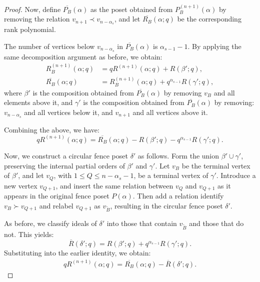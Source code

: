 \documentclass{article}
\theoremstyle{remark}
\begin{document}
\begin{proof}
Now, define \( \overline{P_B}(\alpha) \) as the poset obtained from \( P_B^{(n+1)}(\alpha) \) by removing the relation \( v_{n+1} \prec v_{n - \alpha_s} \), and let \( \overline{R_B}(\alpha; q) \) be the corresponding rank polynomial. 

The number of vertices below \( v_{n - \alpha_s} \) in \( \overline{P_B}(\alpha) \) is \(\alpha_{s-1}-1 \). By applying the same decomposition argument as before, we obtain:
\begin{align*}
    R_B^{(n+1)}(\alpha; q) &= q R^{(n+1)}(\alpha; q) + R(\beta'; q), \\
    \overline{R_B}(\alpha; q) &= R_B^{(n+1)}(\alpha; q) + q^{\alpha_{s-1}} R(\gamma'; q),
\end{align*}
where \( \beta' \) is the composition obtained from \( \overline{P_B}(\alpha) \) by removing \( v_B \) and all elements above it, and \( \gamma' \) is the composition obtained from \( \overline{P_B}(\alpha) \) by removing: \( v_{n - \alpha_s} \) and all vertices below it, and \( v_{n+1} \) and all vertices above it.

Combining the above, we have:
\[
q R^{(n+1)}(\alpha; q) = \overline{R_B}(\alpha; q) - R(\beta'; q) - q^{\alpha_{s-1}} R(\gamma'; q).
\]

Now, we construct a circular fence poset \( \delta' \) as follows. Form the union \( \beta' \cup \gamma' \), preserving the internal partial orders of \( \beta' \) and \( \gamma' \). Let \( v_B \) be the terminal vertex of \( \beta' \), and let \( v_Q \), with \( 1 \leq Q \leq n - \alpha_s - 1 \), be a terminal vertex of \( \gamma' \). Introduce a new vertex \( v_{Q+1} \), and insert the same relation between \( v_Q \) and \( v_{Q+1} \) as it appears in the original fence poset \( P(\alpha) \). Then add a relation identify \( v_{B} \succ v_{Q+1} \) and relabel $v_{Q+1}$ as \( v_{\tilde{B}} \), resulting in the circular fence poset \( \delta' \).

As before, we classify ideals of \( \delta' \) into those that contain \( v_{\tilde{B}} \) and those that do not. This yields:
\[
\overline{R}(\delta'; q) = R(\beta'; q) + q^{\alpha_{s-1}} R(\gamma'; q).
\]
Substituting into the earlier identity, we obtain:
\begin{align}
    q R^{(n+1)}(\alpha; q) = \overline{R_B}(\alpha; q) - \overline{R}(\delta'; q).
\end{align}

\end{proof}
\end{document}
